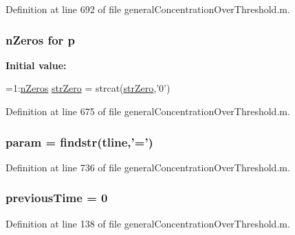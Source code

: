 Definition at line 692 of file general\-Concentration\-Over\-Threshold.\-m.

\hypertarget{a00022_aa2b4c35904308d35fc5d606a429e608d}{
\subsubsection[{p}]{ {\bf n\-Zeros} for p}}\label{a00022_aa2b4c35904308d35fc5d606a429e608d}
{\bfseries Initial value\-:}
\begin{DoxyCode}
=1:\hyperlink{a00022_ac4353d99277795cadf898255e2c73c71}{nZeros}
            \hyperlink{a00019_ab253e75f6224bf843e7a5ff2fb472e7d}{strZero} = strcat(\hyperlink{a00019_ab253e75f6224bf843e7a5ff2fb472e7d}{strZero},\textcolor{charliteral}{'0'})
\end{DoxyCode}


Definition at line 675 of file general\-Concentration\-Over\-Threshold.\-m.

\hypertarget{a00022_a51f20d6b1b54a2eee3be0e8adc96a0ae}{
\subsubsection[{param}]{\setlength{\rightskip}{0pt plus 5cm}param = findstr({\bf tline},'=')}}\label{a00022_a51f20d6b1b54a2eee3be0e8adc96a0ae}


Definition at line 736 of file general\-Concentration\-Over\-Threshold.\-m.

\hypertarget{a00022_a17b8652a085b5add031a40fb1c9a680e}{
\subsubsection[{previous\-Time}]{\setlength{\rightskip}{0pt plus 5cm}previous\-Time = 0}}\label{a00022_a17b8652a085b5add031a40fb1c9a680e}


Definition at line 138 of file general\-Concentration\-Over\-Threshold.\-m.

